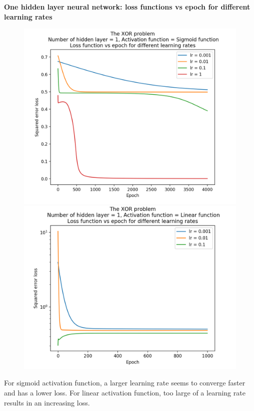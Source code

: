 \documentclass[12pt]{amsart}
\begin{document}
\textbf{One hidden layer neural network: loss functions vs epoch for different learning rates}
\begin{figure}[h]
\includegraphics[width=0.49\columnwidth]{xor_sigmoid_mse_lrs}
\includegraphics[width=0.49\columnwidth]{xor_linear_mse_lrs}
\end{figure}

For sigmoid activation function, a larger learning rate seems to converge faster and has a lower loss. For linear activation function, too large of a learning rate results in an increasing loss. \\


\end{document}
